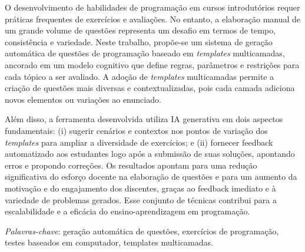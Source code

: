 \begin{resumo}
O desenvolvimento de habilidades de programação em cursos introdutórios requer práticas frequentes de exercícios e avaliações. No entanto, a elaboração manual de um grande volume de questões representa um desafio em termos de tempo, consistência e variedade. Neste trabalho, propõe-se um sistema de geração automática de questões de programação baseado em \textit{templates} multicamadas, ancorado em um modelo cognitivo que define regras, parâmetros e restrições para cada tópico a ser avaliado. A adoção de \textit{templates} multicamadas permite a criação de questões mais diversas e contextualizadas, pois cada camada adiciona novos elementos ou variações ao enunciado.

Além disso, a ferramenta desenvolvida utiliza IA generativa em dois aspectos fundamentais: (i) sugerir cenários e contextos nos pontos de variação dos \textit{templates} para ampliar a diversidade de exercícios; e (ii) fornecer feedback automatizado aos estudantes logo após a submissão de suas soluções, apontando erros e propondo correções. Os resultados apontam para uma redução significativa do esforço docente na elaboração de questões e para um aumento da motivação e do engajamento dos discentes, graças ao feedback imediato e à variedade de problemas gerados. Esse conjunto de técnicas contribui para a escalabilidade e a eficácia do ensino-aprendizagem em programação.

 
 
  \bigbreak

  \noindent
  \textit{Palavras-chave}: geração automática de questões, exercícios de programação, testes baseados em computador, templates multicamadas.
\end{resumo}